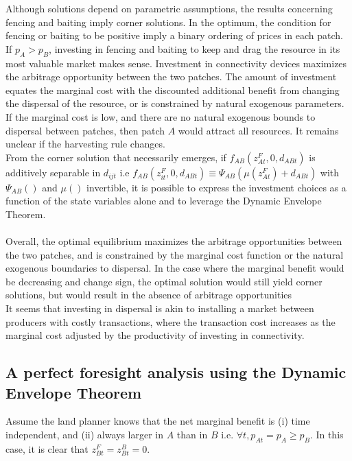 \documentclass{article}
\begin{document}
Although solutions depend on parametric assumptions, the results concerning fencing and baiting imply corner solutions. In the optimum, the condition for fencing or baiting to be positive imply a binary ordering of prices in each patch. If $p_A>p_B$, investing in fencing and baiting to keep and drag the resource in its most valuable market makes sense. Investment in connectivity devices maximizes the arbitrage opportunity between the two patches. The amount of investment equates the marginal cost with the discounted additional benefit from changing the dispersal of the resource, or is constrained by natural exogenous parameters. If the marginal cost is low, and there are no natural exogenous bounds to dispersal between patches, then patch $A$ would attract all resources. It remains unclear if the harvesting rule changes.\\
From the corner solution that necessarily emerges, if $f_{AB}(z_{At}^F,0, d_{ABt})$ is additively separable in $d_{ijt}$ i.e $f_{AB}(z_{it}^F,0, d_{ABt}) \equiv \Psi_{AB}\left(\mu(z_{At}^F) + d_{ABt}\right)$ with $\Psi_{AB}()$ and $\mu()$ invertible,  it is possible to express the investment choices as a function of the state variables alone and to leverage the Dynamic Envelope Theorem.
\\\\
Overall, the optimal equilibrium maximizes the arbitrage opportunities between the two patches, and is constrained by the marginal cost function or the natural exogenous boundaries to dispersal. In the case where the marginal benefit would be decreasing and change sign, the optimal solution would still yield corner solutions, but would result in the absence of arbitrage opportunities\\
It seems that investing in dispersal is akin to installing a market between producers with costly transactions, where the transaction cost increases as the marginal cost adjusted by the productivity of investing in connectivity. 

\subsection{A perfect foresight analysis using the Dynamic Envelope Theorem}
Assume the land planner knows that the net marginal benefit is (i) time independent, and (ii) always larger in $A$ than in $B$ i.e. $\forall t, p_{At}=p_A \geq p_B$. In this case, it is clear that $z_{Bt}^F=z_{Bt}^B=0$. \\
\end{document}
